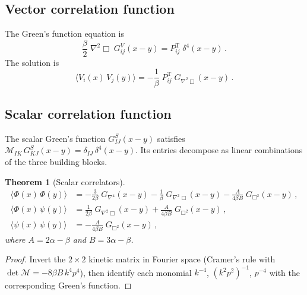 \documentclass[11pt,a4paper]{article}
\newtheorem{theorem}{Theorem}
\theoremstyle{definition}
\theoremstyle{remark}
\begin{document}
\subsection{Vector correlation function}

The Green's function equation is
\begin{equation}
  \frac{\beta}{2}\;\nabla^2\Box\;
  G^V_{ij}(x-y) = P^\mathrm{T}_{ij}\;\delta^4(x-y)\,.
\end{equation}
The solution is
\begin{equation}\label{eq:corr-V}
  \boxed{
  \bigl\langle V_i(x)\, V_j(y)\bigr\rangle
  = -\frac{1}{\beta}\;
    P^\mathrm{T}_{ij}\; G_{\nabla^2\Box}(x-y)\,.}
\end{equation}

\subsection{Scalar correlation function}

The scalar Green's function $G^S_{IJ}(x-y)$ satisfies
$\mathcal{M}_{IK}\,G^S_{KJ}(x-y) = \delta_{IJ}\,\delta^4(x-y)$.
Its entries decompose as linear combinations of the three building
blocks.

\begin{theorem}[Scalar correlators]\label{thm:scalar-corr}
\begin{equation}\label{eq:corr-scalar}
  \boxed{
  \begin{aligned}
    \langle\Phi(x)\,\Phi(y)\rangle
    &= -\frac{3}{2\beta}\;G_{\nabla^4}(x-y)
     - \frac{1}{\beta}\;G_{\nabla^2\Box}(x-y)
     - \frac{A}{4\beta B}\;G_{\Box^2}(x-y)\,,\\[6pt]
    \langle\Phi(x)\,\psi(y)\rangle
    &= \frac{1}{2\beta}\;G_{\nabla^2\Box}(x-y)
     + \frac{A}{4\beta B}\;G_{\Box^2}(x-y)\,,\\[6pt]
    \langle\psi(x)\,\psi(y)\rangle
    &= -\frac{A}{4\beta B}\;G_{\Box^2}(x-y)\,,
  \end{aligned}}
\end{equation}
where $A = 2\alpha - \beta$ and $B = 3\alpha - \beta$.
\end{theorem}

\begin{proof}
Invert the $2\times2$ kinetic matrix in Fourier space
(Cramer's rule with $\det\mathcal{M} = -8\beta B\,k^4 p^4$),
then identify each monomial $k^{-4}$, $(k^2 p^2)^{-1}$, $p^{-4}$
with the corresponding Green's function.
\end{proof}
\end{document}
